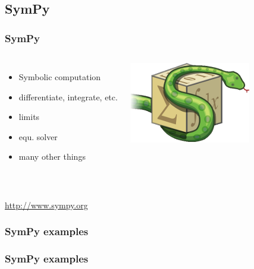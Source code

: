\documentclass[14pt]{beamer}
\begin{document}
\subsection{SymPy}
\begin{frame}
\frametitle{SymPy}
\begin{columns}
\begin{itemize}
\item Symbolic computation
\item differentiate, integrate, etc.
\item limits
\item equ. solver
\item many other things
\end{itemize}
\includegraphics[width=\textwidth]{sympy.png}
\end{columns}
~\\
\url{http://www.sympy.org}
\end{frame}

\begin{frame}
\frametitle{SymPy examples}

\end{frame}

\begin{frame}
\frametitle{SymPy examples}

\end{frame}
\end{document}
